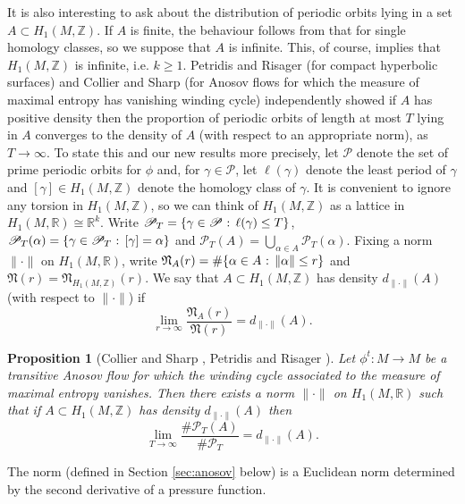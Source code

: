 \documentclass[11pt]{amsart}
\newtheorem{proposition}[theorem]{Proposition}%
\theoremstyle{definition}
\numberwithin{equation}{section}
\numberwithin{theorem}{section}
\def\Z{\mathbb{Z}}
\def\R{\mathbb{R}}
\begin{document}
It is also interesting to ask about the distribution of periodic orbits lying in a set $A \subset H_1(M,\Z)$. 
If $A$ is finite, the behaviour follows from that for single homology classes, so we suppose that 
$A$ is infinite. 
This, of course, implies that $H_1(M,\Z)$ is infinite, i.e. $k \ge 1$.
Petridis and Risager \cite{pet-ris-forum} (for compact hyperbolic surfaces)
and Collier and Sharp \cite{collier-sharp} (for Anosov flows for which the measure of maximal entropy has vanishing winding cycle) independently showed if $A$ has positive density then
the proportion of periodic orbits of length at most $T$ lying in $A$ converges to the density of $A$ (with respect to an appropriate norm), as $T \to \infty$.
To state this and our new results more precisely, let $\mathscr P$ denote the set of prime
periodic orbits for $\phi$ and, for $\gamma \in \mathscr P$, let $\ell(\gamma)$ denote the least period of $\gamma$ and $[\gamma] \in H_1(M,\Z)$ denote the homology class of $\gamma$.
It is convenient to ignore any torsion in $H_1(M,\Z)$, so we can think of $H_1(M,\Z)$
as a lattice in $H_1(M,\R)\cong \R^k$. Write $\mathscr P_T = \{\gamma \in \mathscr P \hbox{ : } 
\ell(\gamma) \le T\}$, $\mathscr P_T(\alpha) = \{\gamma \in \mathscr P_T \hbox{ : } [\gamma]=\alpha\}$
and $\mathscr P_T(A) = \bigcup_{\alpha \in A} \mathscr P_T(\alpha)$.
Fixing a norm $\|\cdot\|$ on $H_1(M,\R)$, 
write $\mathfrak N_A(r) = \#\{\alpha \in A \hbox{ : } \|\alpha\|\le r\}$ and
$\mathfrak N(r) = \mathfrak N_{H_1(M,\Z)}(r)$.
We say that $A \subset H_1(M,\Z)$ has density 
$d_{\|\cdot\|}(A)$ (with respect to $\|\cdot\|$) if 
\[
\lim_{r \to \infty} \frac{\mathfrak N_A(r)}{\mathfrak N(r)} = d_{\|\cdot\|}(A).
\]

\begin{proposition}[Collier and Sharp \cite{collier-sharp}, Petridis and Risager \cite{pet-ris-forum}]
Let $\phi^t : M \to M$ be a transitive Anosov flow for which the winding cycle associated to the measure of maximal entropy vanishes.
Then there exists a norm $\|\cdot\|$
on $H_1(M,\R)$ such that if $A \subset H_1(M,\Z)$ has density $d_{\|\cdot\|}(A)$ then
\[
\lim_{T \to \infty} \frac{\#\mathscr P_T(A)}{\#\mathscr P_T} = d_{\|\cdot\|}(A).
\]
\end{proposition}

The norm (defined in Section \ref{sec:anosov} below) is a Euclidean norm determined by the 
second derivative of a pressure function.
\end{document}
